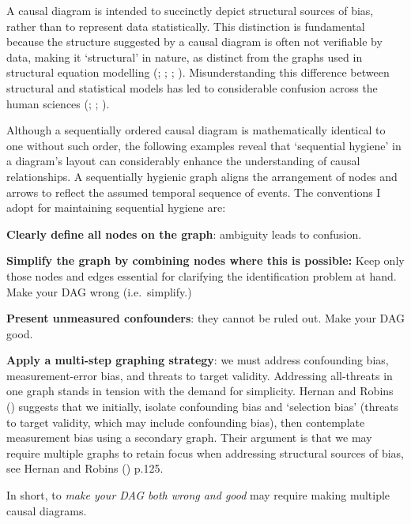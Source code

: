 \documentclass[
  singlecolumn]{article}
\begin{document}
A causal diagram is intended to succinctly depict structural sources of
bias, rather than to represent data statistically. This distinction is
fundamental because the structure suggested by a causal diagram is often
not verifiable by data, making it `structural' in nature, as distinct
from the graphs used in structural equation modelling
(;
;
;
). Misunderstanding this
difference between structural and statistical models has led to
considerable confusion across the human sciences
(;
;
).

Although a sequentially ordered causal diagram is mathematically
identical to one without such order, the following examples reveal that
`sequential hygiene' in a diagram's layout can considerably enhance the
understanding of causal relationships. A sequentially hygienic graph
aligns the arrangement of nodes and arrows to reflect the assumed
temporal sequence of events. The conventions I adopt for maintaining
sequential hygiene are:

\textbf{Clearly define all nodes on the graph}: ambiguity leads to
confusion.

\textbf{Simplify the graph by combining nodes where this is possible:}
Keep only those nodes and edges essential for clarifying the
identification problem at hand. Make your DAG wrong (i.e.~simplify.)

\textbf{Present unmeasured confounders}: they cannot be ruled out. Make
your DAG good.

\textbf{Apply a multi-step graphing strategy}: we must address
confounding bias, measurement-error bias, and threats to target
validity. Addressing all-threats in one graph stands in tension with the
demand for simplicity. Hernan and Robins
() suggests that we initially, isolate
confounding bias and `selection bias' (threats to target validity, which
may include confounding bias), then contemplate measurement bias using a
secondary graph. Their argument is that we may require multiple graphs
to retain focus when addressing structural sources of bias, see Hernan
and Robins () p.125.

In short, to \emph{make your DAG both wrong and good} may require making
multiple causal diagrams.
\end{document}
